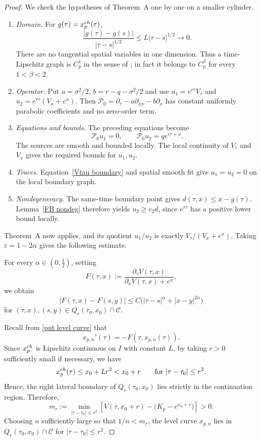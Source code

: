 \documentclass[10pt,a4paper]{amsart}
\begin{document}
\begin{proof}
{
We check the hypotheses of Theorem~A one by one on a smaller cylinder.
\begin{enumerate}[label=(\roman*)]
\item \emph{Domain.} For $g(\tau)=x_p^{\rm ch}(\tau)$,
\[
 \frac{|g(\tau)-g(s)|}{|\tau-s|^{1/2}}
 \leq L|\tau-s|^{1/2}\longrightarrow0.
\]
There are no tangential spatial variables in one dimension. Thus a
time-Lipschitz graph is $C_p^1$ in the sense of
\cite[Definition~1.1]{Kukuljan2022}; in fact it belongs to
$C_p^\beta$ for every $1<\beta<2$.
\item \emph{Operator.} Put $a=\sigma^2/2$,
$b=r-q-\sigma^2/2$ and use
$u_1=e^{r\tau}V_\tau$ and
$u_2=e^{r\tau}(V_x+e^x)$. Then
$\mathcal P_0=\partial_\tau-a\partial_{xx}-b\partial_x$
has constant uniformly parabolic coefficients and no zero-order term.
\item \emph{Equations and bounds.} The preceding equations become
\[
 \mathcal P_0u_1=0,\qquad
 \mathcal P_0u_2=q e^{r\tau+x}.
\]
The sources are smooth and bounded locally. The local continuity of
$V_\tau$ and $V_x$ gives the required bounds for $u_1,u_2$.
\item \emph{Traces.} Equation~\eqref{Vtau boundary} and spatial
smooth fit give $u_1=u_2=0$ on the local boundary graph.
\item \emph{Nondegeneracy.} The same-time boundary point gives
$d(\tau,x)\leq x-g(\tau)$. Lemma~\ref{FB nondeg} therefore yields
$u_2\geq c_2d$, since $e^{r\tau}$ has a positive lower bound locally.
\end{enumerate}
Theorem~A now applies, and its quotient $u_1/u_2$ is exactly
$V_\tau/(V_x+e^x)$. Taking $\varepsilon=1-2\alpha$ gives the
following estimate.
}
For every $\alpha\in(0,\frac12)$, setting
\[
    F(\tau,x)
    :=
    \frac{\partial_\tau V(\tau,x)}
    {\partial_xV(\tau,x)+e^x},
\]
we obtain
\[
    |F(\tau,x)-F(s,y)|
    \leq
    C\bigl(|\tau-s|^\alpha+|x-y|^{2\alpha}\bigr)
\]
for $(\tau,x),(s,y)\in Q_r(\tau_0,x_0)\cap\mathcal C$.

Recall from \eqref{put level curve} that
\[
    x_{p,n}'(\tau)
    =
    -F(\tau,x_{p,n}(\tau)).
\]
Since $x_p^{\rm ch}$ is Lipschitz continuous on $I$ with constant $L$,
by taking $r>0$ sufficiently small if necessary, we have
\[
    x_p^{\rm ch}(\tau)
    \leq x_0+Lr^2
    <x_0+r
    \qquad\text{for }|\tau-\tau_0|\leq r^2.
\]
Hence, the right lateral boundary of
$Q_r(\tau_0,x_0)$ lies strictly in the continuation region. Therefore,
\[
    m_r:=
    \min_{|\tau-\tau_0|\leq r^2}
    \left[
        V(\tau,x_0+r)-\bigl(K_p-e^{x_0+r}\bigr)
    \right]>0.
\]
Choosing $n$ sufficiently large so that $1/n<m_r$, the level curve
$x_{p,n}$ lies in $Q_r(\tau_0,x_0)\cap\mathcal C$ for
$|\tau-\tau_0|\leq r^2$.


\end{proof}
\end{document}
